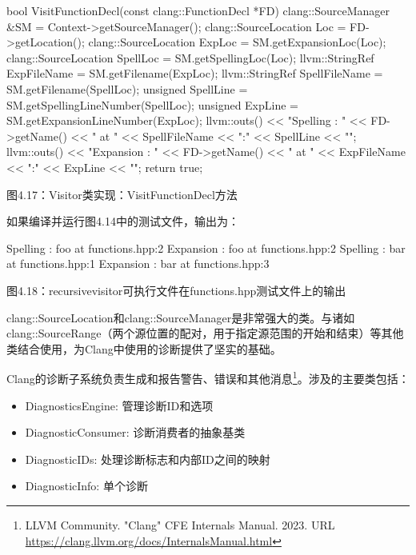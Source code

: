 \begin{cpp}
bool VisitFunctionDecl(const clang::FunctionDecl *FD) {
  clang::SourceManager &SM = Context->getSourceManager();
  clang::SourceLocation Loc = FD->getLocation();
  clang::SourceLocation ExpLoc = SM.getExpansionLoc(Loc);
  clang::SourceLocation SpellLoc = SM.getSpellingLoc(Loc);
  llvm::StringRef ExpFileName = SM.getFilename(ExpLoc);
  llvm::StringRef SpellFileName = SM.getFilename(SpellLoc);
  unsigned SpellLine = SM.getSpellingLineNumber(SpellLoc);
  unsigned ExpLine = SM.getExpansionLineNumber(ExpLoc);
  llvm::outs() << "Spelling : " << FD->getName() << " at " << SpellFileName
               << ":" << SpellLine << "\n";
  llvm::outs() << "Expansion : " << FD->getName() << " at " << ExpFileName
               << ":" << ExpLine << "\n";
  return true;
}
\end{cpp}

\begin{center}
图4.17：Visitor类实现：VisitFunctionDecl方法
\end{center}

如果编译并运行图4.14中的测试文件，输出为：

\begin{shell}
Spelling : foo at functions.hpp:2
Expansion : foo at functions.hpp:2
Spelling : bar at functions.hpp:1
Expansion : bar at functions.hpp:3
\end{shell}

\begin{center}
图4.18：recursivevisitor可执行文件在functions.hpp测试文件上的输出
\end{center}

clang::SourceLocation和clang::SourceManager是非常强大的类。与诸如clang::SourceRange（两个源位置的配对，用于指定源范围的开始和结束）等其他类结合使用，为Clang中使用的诊断提供了坚实的基础。


Clang的诊断子系统负责生成和报告警告、错误和其他消息\footnote{LLVM Community. "Clang" CFE Internals Manual. 2023. URL \url{https://clang.llvm.org/docs/InternalsManual.html}}。涉及的主要类包括：

\begin{itemize}
\item
DiagnosticsEngine: 管理诊断ID和选项

\item
DiagnosticConsumer: 诊断消费者的抽象基类

\item
DiagnosticIDs: 处理诊断标志和内部ID之间的映射

\item
DiagnosticInfo: 单个诊断
\end{itemize}


